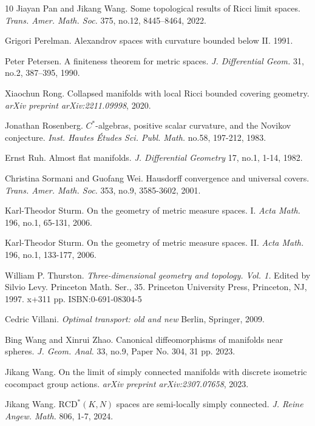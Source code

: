 \documentclass[12pt]{amsart}
\theoremstyle{definition}
\numberwithin{equation}{section}
\newcommand{\rcd}{\text{RCD}}
\begin{document}
\begin{thebibliography}{10}
Jiayan Pan and Jikang Wang.
\newblock Some topological results of Ricci limit spaces. {\em Trans. Amer. Math. Soc. }375, no.12, 8445–8464, 2022.


Grigori Perelman.
\newblock Alexandrov spaces with curvature bounded below II. 1991.

Peter Petersen.
\newblock A finiteness theorem for metric spaces. {\em J. Differential Geom. }31, no.2, 387–395, 1990.

Xiaochun Rong.
\newblock Collapsed manifolds with local Ricci bounded covering geometry. {\em  arXiv preprint  arXiv:2211.09998}, 2020. 


Jonathan Rosenberg. 
\newblock $C^{\ast}$-algebras, positive scalar curvature, and the Novikov conjecture. {\em Inst. Hautes \'Etudes Sci. Publ. Math. } no.58, 197-212, 1983.

Ernst Ruh. 
\newblock Almost flat manifolds. {\em J. Differential Geometry }17, no.1, 1-14, 1982.


Christina Sormani and  Guofang Wei. 
\newblock Hausdorff convergence and universal covers. {\em Trans. Amer. Math. Soc. }353, no.9, 3585-3602, 2001.

Karl-Theodor Sturm.  
\newblock On the geometry of metric measure spaces. I. {\em  Acta Math. }196, no.1, 65-131, 2006.

Karl-Theodor Sturm.  
\newblock On the geometry of metric measure spaces. II. {\em  Acta Math. }196, no.1, 133-177, 2006.

William P. Thurston. 
{\em Three-dimensional geometry and topology. Vol. 1.}
Edited by Silvio Levy. Princeton Math. Ser., 35. Princeton University Press, Princeton, NJ, 1997. x+311 pp.
ISBN:0-691-08304-5

Cedric Villani. {\em Optimal transport: old and new}  Berlin, Springer, 2009.


Bing Wang and Xinrui Zhao.   
\newblock Canonical diffeomorphisms of manifolds near spheres. {\em J. Geom. Anal. }33, no.9, Paper No. 304, 31 pp. 2023.

Jikang Wang.
\newblock On the limit of simply connected manifolds with discrete isometric cocompact group actions. {\em arXiv preprint  arXiv:2307.07658}, 2023.


Jikang Wang.
\newblock $\rcd ^{\ast} (K,N)$  spaces are semi-locally simply connected. {\em J. Reine Angew. Math. }806, 1-7, 2024.


\end{thebibliography}
\end{document}
